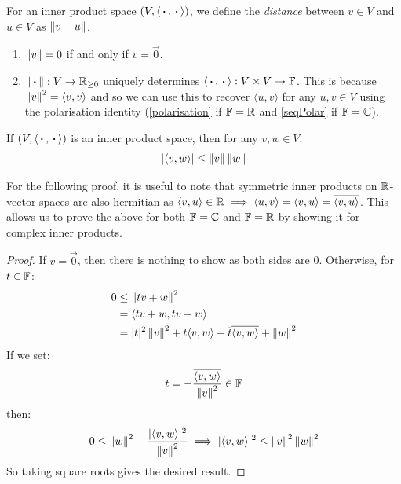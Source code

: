 \documentclass[../main.tex]{subfiles}
\begin{document}
\begin{definition}[Distance]
  For an inner product space $(V, \langle {\hspace{0.18em}\boldsymbol{\cdot}\hspace{0.18em}}, {\hspace{0.18em}\boldsymbol{\cdot}\hspace{0.18em}} \rangle)$, we define the \textit{distance} between $v \in V$ and $u \in V$ as $\left\lVert v - u \right\rVert$.
\end{definition}
\begin{remark}[Remarks]
  \begin{enumerate}
    \item $\left\lVert v \right\rVert = 0$ if and only if $v = \vec{0}$.
    \item $\left\lVert {\hspace{0.18em}\boldsymbol{\cdot}\hspace{0.18em}} \right\rVert: V \to \mathbb{R}_{\geq 0}$ uniquely determines $\langle {\hspace{0.18em}\boldsymbol{\cdot}\hspace{0.18em}}, {\hspace{0.18em}\boldsymbol{\cdot}\hspace{0.18em}} \rangle: V \times V \to \mathbb{F}$.
      This is because $\left\lVert v \right\rVert^2 = \langle v, v \rangle$ and so we can use this to recover $\langle u, v \rangle$ for any $u, v \in V$ using the polarisation identity (\cref{polarisation} if $\mathbb{F} = \mathbb{R}$ and \cref{seqPolar} if $\mathbb{F} = \mathbb{C}$).
  \end{enumerate}
\end{remark}
\begin{lemma}
  If $(V, \langle {\hspace{0.18em}\boldsymbol{\cdot}\hspace{0.18em}}, {\hspace{0.18em}\boldsymbol{\cdot}\hspace{0.18em}} \rangle)$ is an inner product space, then for any $v, w \in V$: \label{CS}
  \[
    |\langle v, w \rangle| \leq \left\lVert v \right\rVert \left\lVert w \right\rVert
  \]
\end{lemma}
\begin{remark}
  For the following proof, it is useful to note that symmetric inner products on $\mathbb{R}$-vector spaces are also hermitian as $\langle v, u \rangle \in \mathbb{R} \implies \langle u, v \rangle = \langle v, u \rangle = \overline{\langle v, u \rangle}$.
  This allows us to prove the above for both $\mathbb{F} = \mathbb{C}$ and $\mathbb{F} = \mathbb{R}$ by showing it for complex inner products.
\end{remark}
\begin{proof}
  If $v = \vec{0}$, then there is nothing to show as both sides are 0.
  Otherwise, for $t \in \mathbb{F}$:
  \begin{align*}
    0 &\leq \left\lVert tv + w \right\rVert^2 \\
      &= \langle tv + w, tv + w \rangle \\
      &= |t|^2 \left\lVert v \right\rVert^2 + t\langle v, w \rangle + \overline{t} \overline{\langle v, w \rangle} + \left\lVert w \right\rVert^2
  \end{align*}
  If we set:
  \[
    t = - \frac{\overline{\langle v, w \rangle}}{\left\lVert v \right\rVert^2} \in \mathbb{F}
  \]
  then:
  \[
    0 \leq \left\lVert w \right\rVert^2 - \frac{|\langle v, w \rangle|^2}{\left\lVert v \right\rVert^2} \implies |\langle v, w \rangle|^2 \leq \left\lVert v \right\rVert^2 \left\lVert w \right\rVert^2
  \]
  So taking square roots gives the desired result.
\end{proof}
\end{document}

